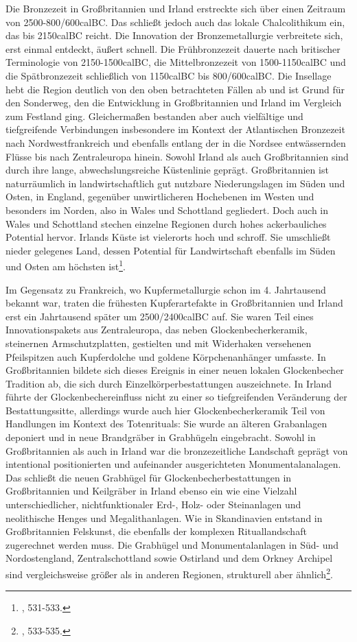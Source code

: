 \documentclass[openany,twoside,twocolumn]{book}
\let\rmarkdownfootnote\footnote%
\def\footnote{\protect\rmarkdownfootnote}
\begin{document}
Die Bronzezeit in Großbritannien und Irland erstreckte sich über einen
Zeitraum von 2500-800/600calBC. Das schließt jedoch auch das lokale
Chalcolithikum ein, das bis 2150calBC reicht. Die Innovation der
Bronzemetallurgie verbreitete sich, erst einmal entdeckt, äußert
schnell. Die Frühbronzezeit dauerte nach britischer Terminologie von
2150-1500calBC, die Mittelbronzezeit von 1500-1150calBC und die
Spätbronzezeit schließlich von 1150calBC bis 800/600calBC. Die Insellage
hebt die Region deutlich von den oben betrachteten Fällen ab und ist
Grund für den Sonderweg, den die Entwicklung in Großbritannien und
Irland im Vergleich zum Festland ging. Gleichermaßen bestanden aber auch
vielfältige und tiefgreifende Verbindungen insbesondere im Kontext der
Atlantischen Bronzezeit nach Nordwestfrankreich und ebenfalls entlang
der in die Nordsee entwässernden Flüsse bis nach Zentraleuropa hinein.
Sowohl Irland als auch Großbritannien sind durch ihre lange,
abwechslungsreiche Küstenlinie geprägt. Großbritannien ist naturräumlich
in landwirtschaftlich gut nutzbare Niederungslagen im Süden und Osten,
in England, gegenüber unwirtlicheren Hochebenen im Westen und besonders
im Norden, also in Wales und Schottland gegliedert. Doch auch in Wales
und Schottland stechen einzelne Regionen durch hohes ackerbauliches
Potential hervor. Irlands Küste ist vielerorts hoch und schroff. Sie
umschließt nieder gelegenes Land, dessen Potential für Landwirtschaft
ebenfalls im Süden und Osten am höchsten ist\footnote{\textcite{roberts_britain_2013},
  531-533.}.

Im Gegensatz zu Frankreich, wo Kupfermetallurgie schon im 4. Jahrtausend
bekannt war, traten die frühesten Kupferartefakte in Großbritannien und
Irland erst ein Jahrtausend später um 2500/2400calBC auf. Sie waren Teil
eines Innovationspakets aus Zentraleuropa, das neben
Glockenbecherkeramik, steinernen Armschutzplatten, gestielten und mit
Widerhaken versehenen Pfeilspitzen auch Kupferdolche und goldene
Körpchenanhänger umfasste. In Großbritannien bildete sich dieses
Ereignis in einer neuen lokalen Glockenbecher Tradition ab, die sich
durch Einzelkörperbestattungen auszeichnete. In Irland führte der
Glockenbechereinfluss nicht zu einer so tiefgreifenden Veränderung der
Bestattungssitte, allerdings wurde auch hier Glockenbecherkeramik Teil
von Handlungen im Kontext des Totenrituals: Sie wurde an älteren
Grabanlagen deponiert und in neue Brandgräber in Grabhügeln eingebracht.
Sowohl in Großbritannien als auch in Irland war die bronzezeitliche
Landschaft geprägt von intentional positionierten und aufeinander
ausgerichteten Monumentalanalagen. Das schließt die neuen Grabhügel für
Glockenbecherbestattungen in Großbritannien und Keilgräber in Irland
ebenso ein wie eine Vielzahl unterschiedlicher, nichtfunktionaler Erd-,
Holz- oder Steinanlagen und neolithische Henges und Megalithanlagen. Wie
in Skandinavien entstand in Großbritannien Felskunst, die ebenfalls der
komplexen Rituallandschaft zugerechnet werden muss. Die Grabhügel und
Monumentalanlagen in Süd- und Nordostengland, Zentralschottland sowie
Ostirland und dem Orkney Archipel sind vergleichsweise größer als in
anderen Regionen, strukturell aber ähnlich\footnote{\textcite{roberts_britain_2013},
  533-535.}.
\end{document}
